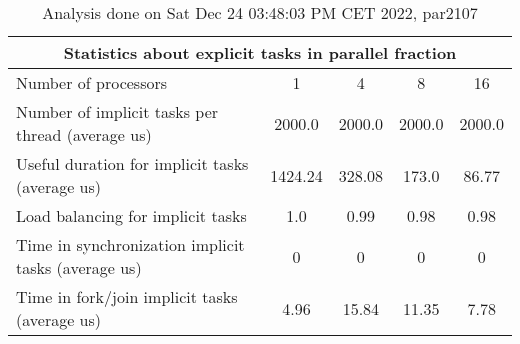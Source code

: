 \begin{table}[h]
\begin{center}
\begin{tabular}{|l|c|c|c|c|}
\hline
\multicolumn{5}{|c|}{Statistics about explicit tasks in parallel fraction} \\
\hline
\hline
Number of processors & 1 & 4 & 8 & 16 \\
\hline
\hline
Number of implicit tasks per thread (average us)    &          2000.0 &          2000.0 &          2000.0 &          2000.0 \\
\hline
Useful duration for implicit tasks (average us)     &         1424.24 &          328.08 &           173.0 &           86.77 \\
\hline
Load balancing for implicit tasks                &             1.0 &            0.99 &            0.98 &            0.98 \\
\hline
Time in synchronization implicit tasks (average us) &               0 &               0 &               0 &               0 \\
\hline
Time in fork/join implicit tasks (average us)       &            4.96 &           15.84 &           11.35 &            7.78 \\
\hline
\end{tabular}
\end{center}
\caption{ Analysis done on Sat Dec 24 03:48:03 PM CET 2022, par2107}
\end{table}
